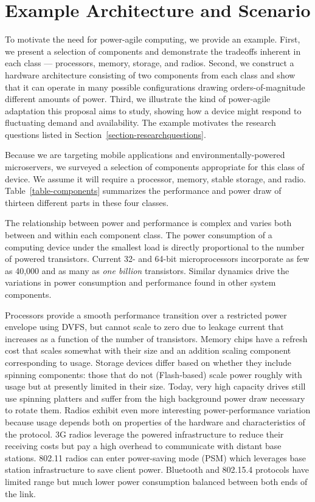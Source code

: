\section{Example Architecture and Scenario}
\label{section-architectureandscenario}



To motivate the need for power-agile computing, we provide an example. First,
we present a selection of components and demonstrate the tradeoffs inherent
in each class --- processors, memory, storage, and radios. Second, we
construct a hardware architecture consisting of two components from each
class and show that it can operate in many possible configurations drawing
orders-of-magnitude different amounts of power. Third, we illustrate the kind
of power-agile adaptation this proposal aims to study, showing how a device
might respond to fluctuating demand and availability. The example motivates
the research questions listed in Section~\ref{section-researchquestions}.

Because we are targeting mobile applications and environmentally-powered
microservers, we surveyed a selection of components appropriate for this
class of device. We assume it will require a processor, memory, stable
storage, and radio. Table~\ref{table-components} summarizes the performance
and power draw of thirteen different parts in these four classes.

The relationship between power and performance is complex and varies both
between and within each component class. The power consumption of a computing
device under the smallest load is directly proportional to the number of
powered transistors. Current 32- and 64-bit microprocessors incorporate as
few as 40,000 and as many as \textit{one billion} transistors. Similar
dynamics drive the variations in power consumption and performance found
in other system components.

Processors provide a smooth performance transition over a restricted power
envelope using DVFS, but cannot scale to zero due to leakage current that
increases as a function of the number of transistors. Memory chips have a
refresh cost that scales somewhat with their size and an addition scaling
component corresponding to usage. Storage devices differ based on whether
they include spinning components: those that do not (Flash-based) scale power
roughly with usage but at presently limited in their size. Today, very high
capacity drives still use spinning platters and suffer from the high
background power draw necessary to rotate them. Radios exhibit even more
interesting power-performance variation because usage depends both on
properties of the hardware and characteristics of the protocol. 3G radios
leverage the powered infrastructure to reduce their receiving costs but pay a
high overhead to communicate with distant base stations. 802.11 radios can
enter power-saving mode (PSM) which leverages base station infrastructure to
save client power. Bluetooth and 802.15.4 protocols have limited range but
much lower power consumption balanced between both ends of the link.

